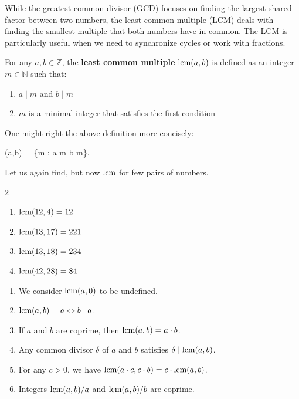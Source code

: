 \documentclass[../../book.tex]{subfiles}
\begin{document}
While the greatest common divisor (GCD) focuses on finding the largest shared factor between two numbers, the least common multiple (LCM) deals with finding the smallest multiple that both numbers have in common. The LCM is particularly useful when we need to synchronize cycles or work with fractions.

\begin{definition}[LCM]
    For any $a, b \in \mathbb{Z}$, the \textbf{least common multiple} $\text{lcm}(a,
    b)$ is defined as an integer $m \in \mathbb{N}$ such that:
    \begin{enumerate}
        \item $a \mid m$ and $b \mid m$
        \item $m$ is a minimal integer that satisfies the first condition 
    \end{enumerate}

    One might right the above definition more concisely:
    \begin{xequation}
        \lcm(a,b) = \min\{m \in {}: a \mid m \;  \; b \mid m\}.
    \end{xequation}
\end{definition}

\begin{example}
    Let us again find, but now $\text{lcm}$ for few pairs of numbers.
    \hfill
    \begin{xmulticols}{2}
        \begin{enumerate}
            \item $\text{lcm}(12, 4) = 12$
            \item $\text{lcm}(13, 17) = 221$
            \item $\text{lcm}(13, 18) = 234$
            \item $\text{lcm}(42, 28) = 84$
        \end{enumerate}
    \end{xmulticols}
\end{example}

\begin{lemma} 
    \hfil
    \begin{enumerate}
        \item We consider $\text{lcm}(a, 0)$ to be undefined.
        \item $\text{lcm}(a, b) = a \Leftrightarrow b \mid a$.
        \item If $a$ and $b$ are coprime, then $\text{lcm}(a, b) = a \cdot b$.
        \item Any common divisor $\delta$ of $a$ and $b$ satisfies $\delta \mid \text{lcm}(a, b)$.
        \item For any $c > 0$, we have $\text{lcm}(a \cdot c, c \cdot b) =  c \cdot \text{lcm}(a, b)$.
        \item Integers $\text{lcm}(a, b)/a$ and $\text{lcm}(a, b) / b$ are coprime.
    \end{enumerate}
\end{lemma}
\end{document}
